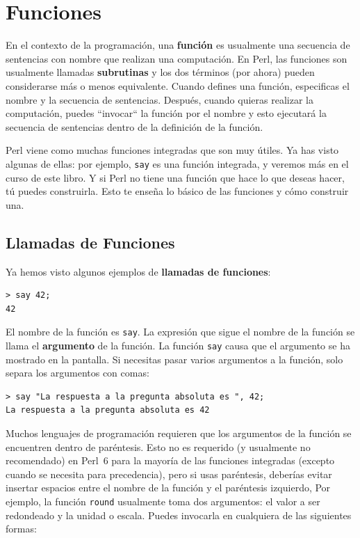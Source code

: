 \chapter{Funciones}
\label{funcchap}

En el contexto de la programación, una {\bf función}
es usualmente una secuencia de sentencias con nombre
que realizan una computación. En Perl, las funciones
son usualmente llamadas {\bf subrutinas} y los dos términos
(por ahora) pueden considerarse  más o menos equivalente. Cuando defines
una función, especificas el nombre y la secuencia de sentencias.
Después, cuando quieras realizar la computación, puedes 
``invocar`` la función por el nombre y esto ejecutará la secuencia
de sentencias dentro de la definición de la función.

Perl viene como muchas funciones integradas que son muy útiles.
Ya has visto algunas de ellas: por ejemplo, {\tt say} es una función 
integrada, y veremos más en el curso de este libro. Y si Perl no tiene
una función que hace lo que deseas hacer, tú puedes construirla. Esto
te enseña lo básico de las funciones y cómo construir una.

\section{Llamadas de Funciones}
\label{functionchap}

Ya hemos visto algunos ejemplos de {\bf llamadas de funciones}:

\begin{verbatim}
> say 42;
42
\end{verbatim}
%
El nombre de la función es {\tt say}. La expresión que sigue el
nombre de la función se llama el {\bf argumento} de la función.
La función {\tt say} causa que el argumento se ha mostrado en 
la pantalla. Si necesitas pasar varios argumentos a la función, 
solo separa los argumentos con comas:

\begin{verbatim}
> say "La respuesta a la pregunta absoluta es ", 42;
La respuesta a la pregunta absoluta es 42
\end{verbatim}
%

Muchos lenguajes de programación requieren que los argumentos de
la función se encuentren dentro de paréntesis. Esto no es requerido
(y usualmente no recomendado) en Perl~6 para la mayoría de 
las funciones integradas (excepto cuando se necesita para 
precedencia), pero si usas paréntesis, deberías evitar insertar 
espacios entre el nombre de la función y el paréntesis izquierdo,
Por ejemplo, la función {\tt round} usualmente toma dos argumentos:
el valor a ser redondeado y la unidad o escala.
Puedes invocarla en cualquiera de las siguientes formas:

